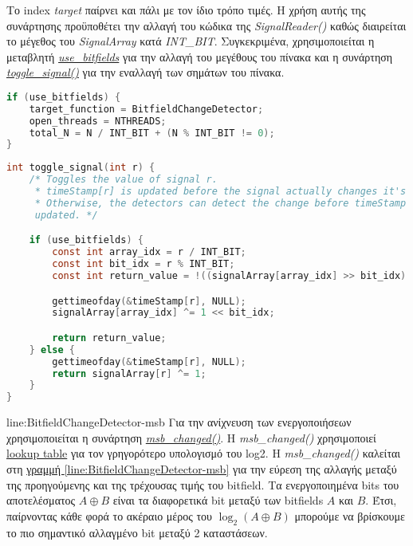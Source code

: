 Το index \textit{target} παίρνει και πάλι με τον ίδιο τρόπο τιμές.
Η χρήση αυτής της συνάρτησης προϋποθέτει την αλλαγή του κώδικα της 
\textit{SignalReader()} 
καθώς διαιρείται το μέγεθος του \textit{SignalArray} κατά \textit{INT\_BIT}. 
Συγκεκριμένα, χρησιμοποιείται η μεταβλητή 
\hyperref[lst:total_N]{\textit{use\_bitfields}} για την αλλαγή του μεγέθους του 
πίνακα και η συνάρτηση \hyperref[lst:togle_signal]{\textit{toggle\_signal()}} 
για την εναλλαγή των σημάτων του πίνακα.
\begin{lstlisting}[language=c, caption={Αλλαγή μεγέθους του SignalArray}, 
escapechar=$, label={lst:total_N}]
if (use_bitfields) {
    target_function = BitfieldChangeDetector;
    open_threads = NTHREADS;
    total_N = N / INT_BIT + (N % INT_BIT != 0);
}
\end{lstlisting}
\begin{lstlisting}[language=c, caption={toggle\_signal()}, 
escapechar=$, label={lst:togle_signal}]
int toggle_signal(int r) {
    /* Toggles the value of signal r.
     * timeStamp[r] is updated before the signal actually changes it's value.
     * Otherwise, the detectors can detect the change before timeStamp is 
     updated. */

    if (use_bitfields) {
        const int array_idx = r / INT_BIT;
        const int bit_idx = r % INT_BIT;
        const int return_value = !((signalArray[array_idx] >> bit_idx) & 1);

        gettimeofday(&timeStamp[r], NULL);
        signalArray[array_idx] ^= 1 << bit_idx;

        return return_value;
    } else {
        gettimeofday(&timeStamp[r], NULL);
        return signalArray[r] ^= 1;
    }
}
\end{lstlisting}
line:BitfieldChangeDetector-msb
Για την ανίχνευση των ενεργοποιήσεων χρησιμοποιείται η συνάρτηση 
\hyperref[lst:msb_changed]{\textit{msb\_changed()}}. H \textit{msb\_changed()} 
χρησιμοποιεί 
\href{https://graphics.stanford.edu/~seander/bithacks.html#IntegerLogLookup}{lookup
 table} για τον γρηγορότερο υπολογισμό του log2. H \textit{msb\_changed()} 
 καλείται στη
 \hyperref[line:BitfieldChangeDetector-msb]{γραμμή 
 \ref*{line:BitfieldChangeDetector-msb}} για την εύρεση της αλλαγής μεταξύ της 
 προηγούμενης και της τρέχουσας τιμής του bitfield.
 Τα ενεργοποιημένα bits του αποτελέσματος $A \oplus B$ είναι τα διαφορετικά bit 
 μεταξύ των bitfields $A$ και $B$.
 Έτσι, παίρνοντας κάθε φορά το ακέραιο μέρος του $\log_2 \left( A \oplus B 
 \right)$ 
 μπορούμε να βρίσκουμε το πιο σημαντικό αλλαγμένο bit μεταξύ 2 καταστάσεων.
